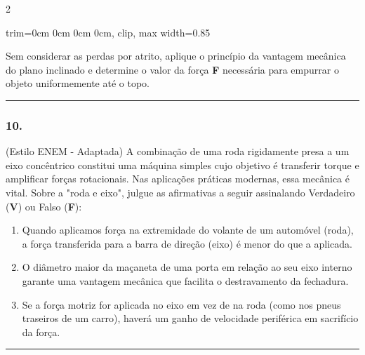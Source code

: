 \documentclass[twoside, 10pt, a4paper]{article}
\newlength{\espacoPreQuestao}\setlength{\espacoPreQuestao}{0.1cm}
\newlength{\espacoQuestao}\setlength{\espacoQuestao}{0.2cm}
\newlength{\espacoAlt}\setlength{\espacoAlt}{0.2cm}
\newcommand{\larguraTikz}{0.85\linewidth}
\begin{document}
\begin{multicols*}{2}
\begin{center}
\begin{adjustbox}{trim=0cm 0cm 0cm 0cm, clip, max width=\larguraTikz}
\end{adjustbox}
\end{center}
Sem considerar as perdas por atrito, aplique o princípio da vantagem mecânica do plano inclinado e determine o valor da força \textbf{F} necessária para empurrar o objeto uniformemente até o topo.
\par\vspace{\espacoQuestao}

\noindent\textcolor{CorLinha}{\rule{\linewidth}{0.5pt}} 
\par\vspace{\espacoPreQuestao}
\subsubsection*{10.} (Estilo ENEM - Adaptada) A combinação de uma roda rigidamente presa a um eixo concêntrico constitui uma máquina simples cujo objetivo é transferir torque e amplificar forças rotacionais. Nas aplicações práticas modernas, essa mecânica é vital. Sobre a "roda e eixo", julgue as afirmativas a seguir assinalando Verdadeiro (\textbf{V}) ou Falso (\textbf{F}):
\begin{enumerate}[label=\Roman*., itemsep=\espacoAlt]
    \item Quando aplicamos força na extremidade do volante de um automóvel (roda), a força transferida para a barra de direção (eixo) é menor do que a aplicada.
    \item O diâmetro maior da maçaneta de uma porta em relação ao seu eixo interno garante uma vantagem mecânica que facilita o destravamento da fechadura.
    \item Se a força motriz for aplicada no eixo em vez de na roda (como nos pneus traseiros de um carro), haverá um ganho de velocidade periférica em sacrifício da força.
\end{enumerate}
\par\vspace{\espacoQuestao}

\noindent\textcolor{CorLinha}{\rule{\linewidth}{0.5pt}} 
\par\vspace{\espacoPreQuestao}

\end{multicols*}
\end{document}
